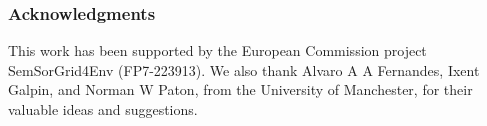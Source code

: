 \documentclass{llncs}
\begin{document}



%






\subsubsection{Acknowledgments}
This work has been supported by the European Commission project SemSorGrid4Env (FP7-223913). We also thank Alvaro A A
Fernandes, Ixent Galpin, and Norman W Paton, from the University of Manchester, for their valuable ideas and
suggestions.

{}


\end{document}
